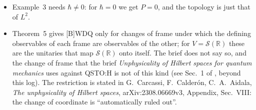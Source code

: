\documentclass[11pt]{article}
\begin{document}
\begin{itemize}
  commutation relation (normal ordering), which the brief does not mention.
\item Example~3 needs $\hbar \ne 0$: for $\hbar = 0$ we get $P = 0$, and the topology is just
  that of $L^2$.
\item Theorem~5 gives [B]WDQ only for changes of frame under which the defining observables of
  each frame are observables of the other; for $V = \mathcal{S}(\mathbb{R})$ these are the
  unitaries that map $\mathcal{S}(\mathbb{R})$ onto itself. The brief does not say so, and the
  change of frame that the brief \emph{Unphysicality of Hilbert spaces for quantum mechanics}
  uses against QSTO:H is not of this kind (see Sec.~1 of
  , beyond this log). The restriction is stated in
  G.~Carcassi, F.~Calder\'on, C.~A.~Aidala, \emph{The unphysicality of Hilbert spaces},
  arXiv:2308.06669v3, Appendix, Sec.~VIII: the change of coordinate is ``automatically ruled
  out''.
\end{itemize}
\end{document}
